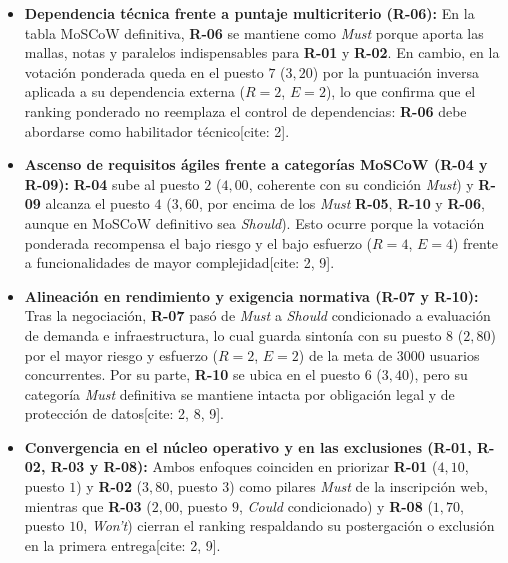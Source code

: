 \documentclass[12pt,a4paper]{article}
\begin{document}
\begin{itemize}[leftmargin=1.5em]

    \item \textbf{Dependencia técnica frente a puntaje multicriterio (R-06):} En la tabla MoSCoW definitiva, \textbf{R-06} se mantiene como \textit{Must} porque aporta las mallas, notas y paralelos indispensables para \textbf{R-01} y \textbf{R-02}. En cambio, en la votación ponderada queda en el puesto $7$ ($3{,}20$) por la puntuación inversa aplicada a su dependencia externa ($R=2$, $E=2$), lo que confirma que el ranking ponderado no reemplaza el control de dependencias: \textbf{R-06} debe abordarse como habilitador técnico[cite: 2].

    \item \textbf{Ascenso de requisitos ágiles frente a categorías MoSCoW (R-04 y R-09):} \textbf{R-04} sube al puesto $2$ ($4{,}00$, coherente con su condición \textit{Must}) y \textbf{R-09} alcanza el puesto $4$ ($3{,}60$, por encima de los \textit{Must} \textbf{R-05}, \textbf{R-10} y \textbf{R-06}, aunque en MoSCoW definitivo sea \textit{Should}). Esto ocurre porque la votación ponderada recompensa el bajo riesgo y el bajo esfuerzo ($R=4$, $E=4$) frente a funcionalidades de mayor complejidad[cite: 2, 9].

    \item \textbf{Alineación en rendimiento y exigencia normativa (R-07 y R-10):} Tras la negociación, \textbf{R-07} pasó de \textit{Must} a \textit{Should} condicionado a evaluación de demanda e infraestructura, lo cual guarda sintonía con su puesto $8$ ($2{,}80$) por el mayor riesgo y esfuerzo ($R=2$, $E=2$) de la meta de $3000$ usuarios concurrentes. Por su parte, \textbf{R-10} se ubica en el puesto $6$ ($3{,}40$), pero su categoría \textit{Must} definitiva se mantiene intacta por obligación legal y de protección de datos[cite: 2, 8, 9].

    \item \textbf{Convergencia en el núcleo operativo y en las exclusiones (R-01, R-02, R-03 y R-08):} Ambos enfoques coinciden en priorizar \textbf{R-01} ($4{,}10$, puesto $1$) y \textbf{R-02} ($3{,}80$, puesto $3$) como pilares \textit{Must} de la inscripción web, mientras que \textbf{R-03} ($2{,}00$, puesto $9$, \textit{Could} condicionado) y \textbf{R-08} ($1{,}70$, puesto $10$, \textit{Won't}) cierran el ranking respaldando su postergación o exclusión en la primera entrega[cite: 2, 9].

\end{itemize}
\end{document}
